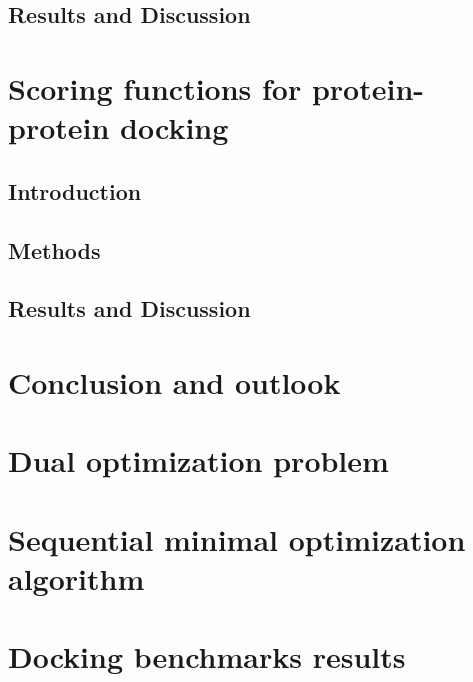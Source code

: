 \documentclass[12pt,twoside]{report}
\begin{document}
  \newpage
  
  \section{Results and Discussion}
  

  \newpage
  
\chapter{Scoring functions for protein-protein docking}

  \section{Introduction}
  
  
  \newpage
  
  \section{Methods}
  
  
  \newpage

  \section{Results and Discussion}
  

  \newpage
  
\chapter{Conclusion and outlook}


\appendix
\chapter{Dual optimization problem}
\label{Ch:appendixDual}

\chapter{Sequential minimal optimization algorithm}
\label{Ch:AppendixSMO}

\chapter{Docking benchmarks results}




  


\end{document}

